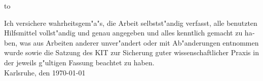 \begin{otherlanguage}{ngerman}
\thispagestyle{empty}
\vspace*{30\baselineskip}
\hbox to \textwidth{\hrulefill}
\par
\noindent Ich versichere wahrheitsgem"a"s, die Arbeit selbstst"andig verfasst, alle benutzten Hilfsmittel vollst"andig und genau angegeben und alles kenntlich gemacht zu haben, was aus Arbeiten anderer unver"andert oder mit Ab"anderungen entnommen wurde sowie die Satzung des KIT zur Sicherung guter wissenschaftlicher Praxis in der jeweils g"ultigen Fassung beachtet zu haben.\\

\noindent Karlsruhe, den \today
\end{otherlanguage}
